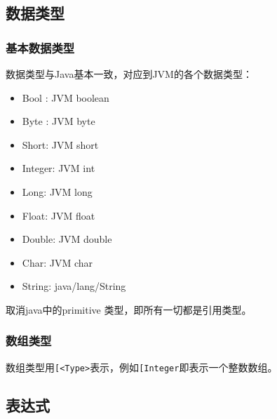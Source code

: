 \documentclass[12pt]{article}
\begin{document}
\subsection{数据类型}\label{ux6570ux636eux7c7bux578b}

\begin{Shaded}
\begin{Highlighting}[]
\NormalTok{    ;}
\NormalTok{    : \textquotesingle{}[\textquotesingle{} type}
\NormalTok{    ;}
\end{Highlighting}
\end{Shaded}

\subsubsection{基本数据类型}\label{ux57faux672cux6570ux636eux7c7bux578b}

数据类型与Java基本一致，对应到JVM的各个数据类型：

\begin{itemize}
\tightlist
\item
  Bool : JVM boolean
\item
  Byte : JVM byte
\item
  Short: JVM short
\item
  Integer: JVM int
\item
  Long: JVM long
\item
  Float: JVM float
\item
  Double: JVM double
\item
  Char: JVM char
\item
  String: java/lang/String
\end{itemize}

取消java中的primitive 类型，即所有一切都是引用类型。

\subsubsection{数组类型}\label{ux6570ux7ec4ux7c7bux578b}

数组类型用\texttt{{[}\textless{}Type\textgreater{}}表示，例如\texttt{{[}Integer}即表示一个整数数组。

\subsection{表达式}\label{ux8868ux8fbeux5f0f}
\end{document}

